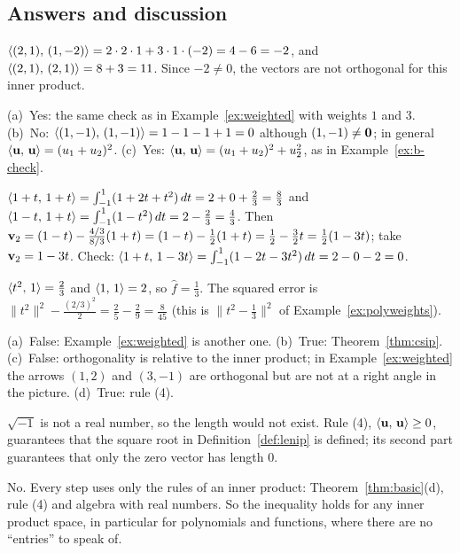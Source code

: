 \documentclass[11pt]{article}
\begin{document}
\subsection*{Answers and discussion}
\begin{description}[leftmargin=0pt,itemsep=5pt]
  \item[Knowledge Check \ref{kc:kcweight}.] $\langle (2,1),\,(1,-2)\rangle=2\cdot2\cdot1+3\cdot1\cdot(-2)=4-6=-2$, and $\langle (2,1),\,(2,1)\rangle=8+3=11$. Since $-2\neq0$, the vectors are not orthogonal for this inner product.
  \item[Knowledge Check \ref{kc:kcwhich}.] (a)~Yes: the same check as in Example~\ref{ex:weighted} with weights $1$ and $3$. (b)~No: $\langle (1,-1),\,(1,-1)\rangle=1-1-1+1=0$ although $(1,-1)\neq\mathbf{0}$; in general $\langle \mathbf{u},\,\mathbf{u}\rangle=(u_1+u_2)^2$. (c)~Yes: $\langle \mathbf{u},\,\mathbf{u}\rangle=(u_1+u_2)^2+u_2^2$, as in Example~\ref{ex:b-check}.
  \item[Knowledge Check \ref{kc:kcgs}.] $\langle 1+t,\,1+t\rangle=\int_{-1}^1(1+2t+t^2)\,dt=2+0+\tfrac23=\tfrac83$ and $\langle 1-t,\,1+t\rangle=\int_{-1}^1(1-t^2)\,dt=2-\tfrac23=\tfrac43$. Then $\mathbf{v}_2=(1-t)-\tfrac{4/3}{8/3}(1+t)=(1-t)-\tfrac12(1+t)=\tfrac12-\tfrac32t=\tfrac12(1-3t)$; take $\mathbf{v}_2=1-3t$. Check: $\langle 1+t,\,1-3t\rangle=\int_{-1}^1(1-2t-3t^2)\,dt=2-0-2=0$.
  \item[Knowledge Check \ref{kc:kcconst}.] $\langle t^2,\,1\rangle=\tfrac23$ and $\langle 1,\,1\rangle=2$, so $\hat f=\tfrac13$. The squared error is $\lVert t^2\rVert^2-\tfrac{(2/3)^2}{2}=\tfrac25-\tfrac29=\tfrac8{45}$ (this is $\lVert t^2-\tfrac13\rVert^2$ of Example~\ref{ex:polyweights}).
  \item[Knowledge Check \ref{kc:kctf}.] (a)~False: Example~\ref{ex:weighted} is another one. (b)~True: Theorem~\ref{thm:csip}. (c)~False: orthogonality is relative to the inner product; in Example~\ref{ex:weighted} the arrows $(1,2)$ and $(3,-1)$ are orthogonal but are not at a right angle in the picture. (d)~True: rule (4).
  \item[Pause and think \ref{think:noneg}.] $\sqrt{-1}$ is not a real number, so the length would not exist. Rule (4), $\langle \mathbf{u},\,\mathbf{u}\rangle\ge0$, guarantees that the square root in Definition~\ref{def:lenip} is defined; its second part guarantees that only the zero vector has length $0$.
  \item[Pause and think \ref{think:coords}.] No. Every step uses only the rules of an inner product: Theorem~\ref{thm:basic}(d), rule (4) and algebra with real numbers. So the inequality holds for any inner product space, in particular for polynomials and functions, where there are no ``entries'' to speak of.

\end{description}
\end{document}
